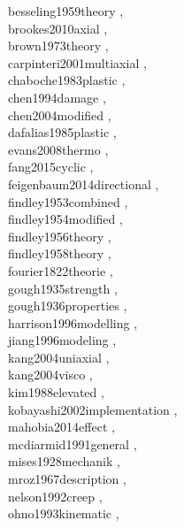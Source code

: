 \documentclass{article}
\begin{document}
besseling1959theory \cite{besseling1959theory}, \\
brookes2010axial \cite{brookes2010axial}, \\
brown1973theory \cite{brown1973theory}, \\
carpinteri2001multiaxial \cite{carpinteri2001multiaxial}, \\
chaboche1983plastic \cite{chaboche1983plastic}, \\
chen1994damage \cite{chen1994damage}, \\
chen2004modified \cite{chen2004modified}, \\
dafalias1985plastic \cite{dafalias1985plastic}, \\
evans2008thermo \cite{evans2008thermo}, \\
fang2015cyclic \cite{fang2015cyclic}, \\
feigenbaum2014directional \cite{feigenbaum2014directional}, \\
findley1953combined \cite{findley1953combined}, \\
findley1954modified \cite{findley1954modified}, \\
findley1956theory \cite{findley1956theory}, \\
findley1958theory \cite{findley1958theory}, \\
fourier1822theorie \cite{fourier1822theorie}, \\
gough1935strength \cite{gough1935strength}, \\
gough1936properties \cite{gough1936properties}, \\
harrison1996modelling \cite{harrison1996modelling}, \\
jiang1996modeling \cite{jiang1996modeling}, \\
kang2004uniaxial \cite{kang2004uniaxial}, \\
kang2004visco \cite{kang2004visco}, \\
kim1988elevated \cite{kim1988elevated}, \\
kobayashi2002implementation \cite{kobayashi2002implementation}, \\
mahobia2014effect \cite{mahobia2014effect}, \\
mcdiarmid1991general \cite{mcdiarmid1991general}, \\
mises1928mechanik \cite{mises1928mechanik}, \\
mroz1967description \cite{mroz1967description}, \\
nelson1992creep \cite{nelson1992creep}, \\
ohno1993kinematic \cite{ohno1993kinematic}, \\
\end{document}
